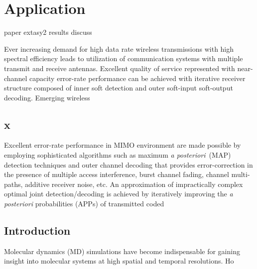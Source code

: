 \chapter{Application}
\label{ch:chapter5}
paper extasy2 results
discuss

Ever increasing demand for high data rate wireless transmissions with high spectral efficiency leads to utilization of communication systems with multiple transmit and receive antennas. Excellent quality of service represented with near-channel capacity error-rate performance can be achieved with iterative receiver structure composed of inner soft detection and outer soft-input soft-output decoding. Emerging wireless 

\section{x}
\label{sec:x45}
Excellent error-rate performance in MIMO environment are made possible by employing sophisticated algorithms such as maximum \emph{a posteriori}~(MAP) detection techniques and outer channel decoding that provides error-correction in the presence of multiple access interference, burst channel fading, channel multi-paths, additive receiver noise, etc. An approximation of impractically complex optimal joint detection/decoding is achieved by iteratively improving the \emph{a posteriori} probabilities (APPs) of transmitted coded 


\section{\label{sec:intro5}Introduction}

Molecular dynamics (MD) simulations have become indispensable for gaining
insight into molecular systems at high spatial and temporal resolutions.
Ho